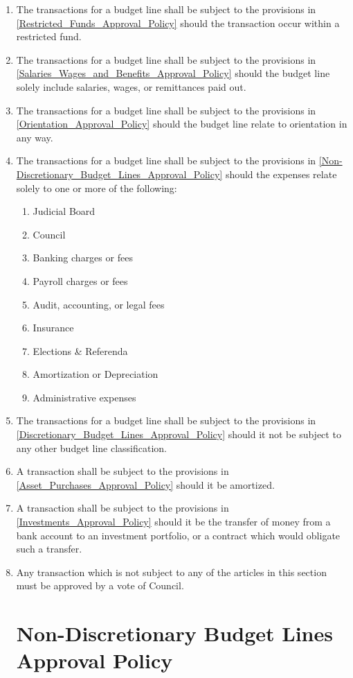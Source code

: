 \documentclass[oneside]{book}
\begin{document}
\begin{enumerate}
\item The transactions for a budget line shall be subject to the provisions in \autoref{Restricted_Funds_Approval_Policy} should the transaction occur within a restricted fund. 
\item The transactions for a budget line shall be subject to the provisions in \autoref{Salaries_Wages_and_Benefits_Approval_Policy} should the budget line solely include salaries, wages, or remittances paid out. 
\item The transactions for a budget line shall be subject to the provisions in \autoref{Orientation_Approval_Policy} should the budget line relate to orientation in any way. 
\item The transactions for a budget line shall be subject to the provisions in \autoref{Non-Discretionary_Budget_Lines_Approval_Policy} should the expenses relate solely to one or more of the following: 
	\begin{enumerate}
	\item Judicial Board
	\item Council
	\item Banking charges or fees
	\item Payroll charges or fees
	\item Audit, accounting, or legal fees
	\item Insurance
	\item Elections \& Referenda
	\item Amortization or Depreciation
	\item Administrative expenses
	\end{enumerate}
\item The transactions for a budget line shall be subject to the provisions in \autoref{Discretionary_Budget_Lines_Approval_Policy} should it not be subject to any other budget line classification. 
\item A transaction shall be subject to the provisions in \autoref{Asset_Purchases_Approval_Policy} should it be amortized.
\item A transaction shall be subject to the provisions in \autoref{Investments_Approval_Policy} should it be the transfer of money from a bank account to an investment portfolio, or a contract which would obligate such a transfer. 
\item Any transaction which is not subject to any of the articles in this section must be approved by a vote of Council.

\section{\label{Non-Discretionary_Budget_Lines_Approval_Policy}Non-Discretionary Budget Lines Approval Policy}


\end{enumerate}
\end{document}
